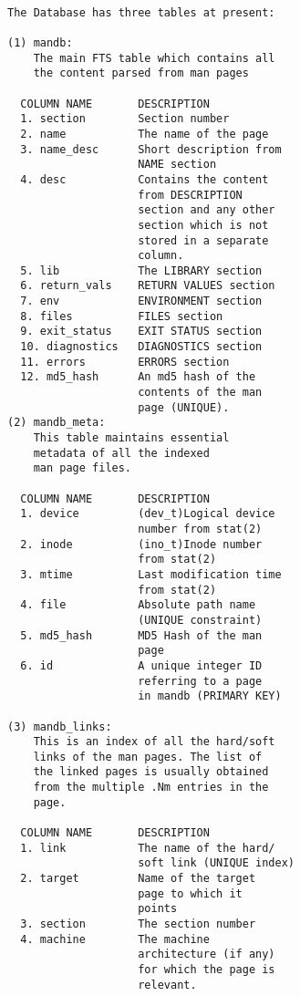 \documentclass[letterpaper,twocolumn,10pt]{article}
\begin{document}
{\tt \small
{}
\begin{lstlisting}
The Database has three tables at present:

(1) mandb:
    The main FTS table which contains all
    the content parsed from man pages

  COLUMN NAME       DESCRIPTION
  1. section        Section number
  2. name           The name of the page  
  3. name_desc      Short description from
                    NAME section  
  4. desc           Contains the content
                    from DESCRIPTION
                    section and any other
                    section which is not
                    stored in a separate
                    column.
  5. lib            The LIBRARY section
  6. return_vals    RETURN VALUES section
  7. env            ENVIRONMENT section
  8. files          FILES section
  9. exit_status    EXIT STATUS section
  10. diagnostics   DIAGNOSTICS section
  11. errors        ERRORS section
  12. md5_hash      An md5 hash of the
                    contents of the man
                    page (UNIQUE).
(2) mandb_meta:
    This table maintains essential
    metadata of all the indexed
    man page files.

  COLUMN NAME       DESCRIPTION
  1. device         (dev_t)Logical device
                    number from stat(2)
  2. inode          (ino_t)Inode number
                    from stat(2)
  3. mtime          Last modification time
                    from stat(2)
  4. file           Absolute path name
                    (UNIQUE constraint)
  5. md5_hash       MD5 Hash of the man
                    page
  6. id             A unique integer ID
                    referring to a page
                    in mandb (PRIMARY KEY)

(3) mandb_links:
    This is an index of all the hard/soft
    links of the man pages. The list of
    the linked pages is usually obtained 
    from the multiple .Nm entries in the
    page.

  COLUMN NAME       DESCRIPTION
  1. link           The name of the hard/
                    soft link (UNIQUE index) 
  2. target         Name of the target
                    page to which it
                    points  
  3. section        The section number  
  4. machine        The machine
                    architecture (if any)
                    for which the page is
                    relevant.
\end{lstlisting}
}
\end{document}
